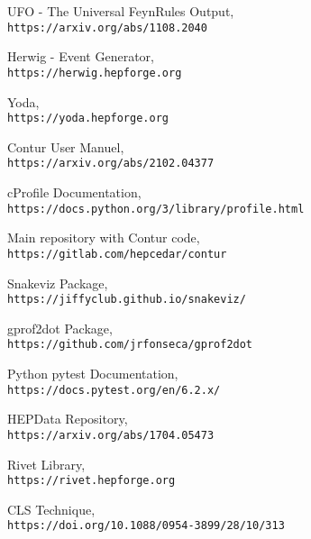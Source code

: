 \documentclass[12pt,phd,a4paper,oneside]{ucl_thesis}
\begin{document}
\begin{thebibliography}{9}
UFO - The Universal FeynRules Output,
\\\texttt{https://arxiv.org/abs/1108.2040}

Herwig - Event Generator,
\\\texttt{https://herwig.hepforge.org}

Yoda,
\\\texttt{https://yoda.hepforge.org}

Contur User Manuel,
\\\texttt{https://arxiv.org/abs/2102.04377}

cProfile Documentation,
\\\texttt{https://docs.python.org/3/library/profile.html}

Main repository with Contur code,
\\\texttt{https://gitlab.com/hepcedar/contur}

Snakeviz Package,
\\\texttt{https://jiffyclub.github.io/snakeviz/}

gprof2dot Package,
\\\texttt{https://github.com/jrfonseca/gprof2dot}

Python pytest Documentation,
\\\texttt{https://docs.pytest.org/en/6.2.x/}

HEPData Repository,
\\\texttt{https://arxiv.org/abs/1704.05473}

Rivet Library,
\\\texttt{https://rivet.hepforge.org}

CLS Technique,
\\\texttt{https://doi.org/10.1088/0954-3899/28/10/313}



\end{thebibliography}


\end{document}
